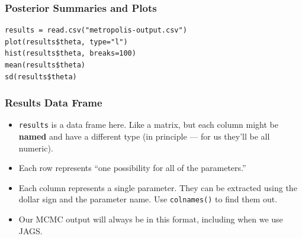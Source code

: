 \documentclass{beamer}
\begin{document}
\begin{frame}[fragile]
\frametitle{Posterior Summaries and Plots}

\begin{verbatim}
results = read.csv("metropolis-output.csv")
plot(results$theta, type="l")
hist(results$theta, breaks=100)
mean(results$theta)
sd(results$theta)
\end{verbatim}

\end{frame}


\begin{frame}[fragile]
\frametitle{Results Data Frame}

\begin{itemize}
\item \texttt{results} is a data frame here. Like a matrix, but each column
might be {\bf named} and have a different type (in principle --- for us they'll
be all numeric).\pause
\item Each row represents ``one possibility for all of the parameters.'' \pause
\item Each column represents a single parameter. They can be extracted using
the dollar sign and the parameter name. Use \texttt{colnames()} to find
them out.\pause
\item Our MCMC output will always be in this format, including when we use
JAGS.
\end{itemize}


\end{frame}
\end{document}
